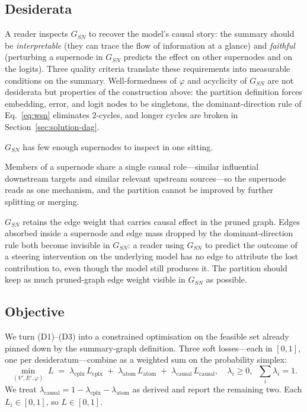     \subsection{Desiderata}
    A reader inspects $G_{SN}$ to recover the model's causal story: the
    summary should be \emph{interpretable} (they can trace the flow of
    information at a glance) and \emph{faithful} (perturbing a supernode
    in $G_{SN}$ predicts the effect on other supernodes and on the
    logits). Three quality criteria translate these requirements into
    measurable conditions on the summary. Well-formedness of $\varphi$
    and acyclicity of $G_{SN}$ are not desiderata but properties of the
    construction above: the partition definition forces embedding,
    error, and logit nodes to be singletons, the dominant-direction
    rule of Eq.~\eqref{eq:wsn} eliminates $2$-cycles, and longer cycles
    are broken in Section~\ref{sec:solution-dag}.
    \begin{description}[leftmargin=2.0em,style=nextline,topsep=2pt,itemsep=2pt]
    \item[(D1) Complexity.] $G_{SN}$ has few enough supernodes to
    inspect in one sitting.
    \item[(D2) Atomicity.] Members of a supernode share a single causal
    role---similar influential downstream targets and similar relevant
    upstream sources---so the supernode reads as one mechanism, and the
    partition cannot be improved by further splitting or merging.
    \item[(D3) Causal information preservation.] $G_{SN}$ retains the
    edge weight that carries causal effect in the pruned graph. Edges
    absorbed inside a supernode and edge mass dropped by the
    dominant-direction rule both become invisible in $G_{SN}$: a reader
    using $G_{SN}$ to predict the outcome of a steering intervention on
    the underlying model has no edge to attribute the lost contribution
    to, even though the model still produces it. The partition should
    keep as much pruned-graph edge weight visible in $G_{SN}$ as
    possible.
    \end{description}

    \subsection{Objective}\label{sec:objective}
    We turn (D1)--(D3) into a constrained optimisation on the feasible
    set already pinned down by the summary-graph definition. Three soft
    losses---each in $[0, 1]$, one per desideratum---combine as a
    weighted sum on the probability simplex:
    \begin{equation}
    \min_{(V', E', \varphi)}\;
    L \;=\;
    \lambda_{\text{cplx}}\, L_{\text{cplx}}
    \;+\;
    \lambda_{\text{atom}}\, L_{\text{atom}}
    \;+\;
    \lambda_{\text{causal}}\, L_{\text{causal}},
    \quad
    \lambda_i \ge 0,\;\; \sum_i \lambda_i = 1.
    \label{eq:Lsum}
    \end{equation}
    We treat $\lambda_{\text{causal}} = 1 - \lambda_{\text{cplx}} -
    \lambda_{\text{atom}}$ as derived and report the remaining two.
    Each $L_i \in [0, 1]$, so $L \in [0, 1]$.

